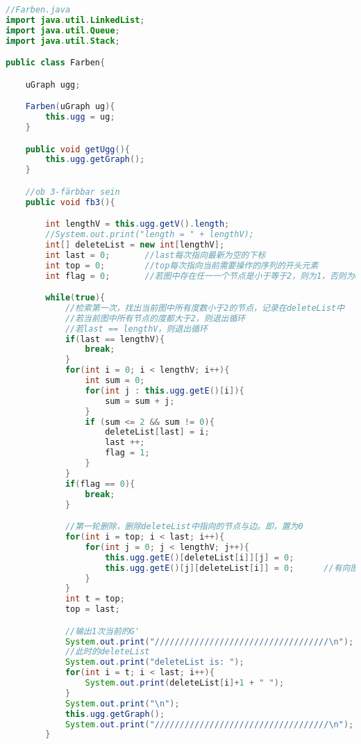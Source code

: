 \begin{lstlisting}[language = java]
//Farben.java
import java.util.LinkedList;
import java.util.Queue;
import java.util.Stack;

public class Farben{

    uGraph ugg;

    Farben(uGraph ug){
        this.ugg = ug;
    }

    public void getUgg(){
        this.ugg.getGraph();
    }

    //ob 3-färbbar sein
    public void fb3(){

        int lengthV = this.ugg.getV().length;
        //System.out.print("length = " + lengthV);
        int[] deleteList = new int[lengthV];
        int last = 0;       //last每次指向最新为空的下标
        int top = 0;        //top每次指向当前需要操作的序列的开头元素
        int flag = 0;       //若图中存在任一一个节点是小于等于2，则为1，否则为0

        while(true){
            //检索第一次，找出当前图中所有度数小于2的节点，记录在deleteList中
            //若当前图中所有节点的度都大于2，则退出循环
            //若last == lengthV，则退出循环
            if(last == lengthV){
                break;
            }
            for(int i = 0; i < lengthV; i++){
                int sum = 0;
                for(int j : this.ugg.getE()[i]){
                    sum = sum + j;
                }
                if (sum <= 2 && sum != 0){
                    deleteList[last] = i;
                    last ++;
                    flag = 1;
                }
            }
            if(flag == 0){
                break;
            }

            //第一轮删除，删除deleteList中指向的节点与边。即，置为0
            for(int i = top; i < last; i++){
                for(int j = 0; j < lengthV; j++){
                    this.ugg.getE()[deleteList[i]][j] = 0;
                    this.ugg.getE()[j][deleteList[i]] = 0;      //有向图中删去此行
                }
            }
            int t = top;
            top = last;

            //输出1次当前的G'
            System.out.print("///////////////////////////////////\n");
            //此时的deleteList
            System.out.print("deleteList is: ");
            for(int i = t; i < last; i++){
                System.out.print(deleteList[i]+1 + " ");
            }
            System.out.print("\n");
            this.ugg.getGraph();
            System.out.print("///////////////////////////////////\n");
        }


\end{lstlisting}
